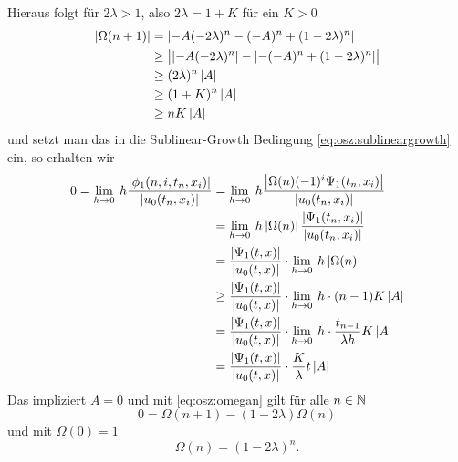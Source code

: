 Hieraus folgt für $2 \lambda > 1$, also $2\lambda = 1 + K$ für ein $K > 0$
\begin{align*}
\left| \Omega(n+1) \right| &= \left| -A (- 2 \lambda)^n -(-A)^n + (1 - 2 \lambda)^n \right|\\
&\geq \bigl\lvert \left| -A (- 2 \lambda)^n \right| - \left| -(-A)^n + (1 - 2 \lambda)^n \right| \bigr\rvert\\
&\geq (2 \lambda)^n \left| A \right|\\
&\geq (1 + K)^n \left| A \right|\\
&\geq n K  \left| A \right|\\
\end{align*}
und setzt man das in die Sublinear-Growth Bedingung \eqref{eq:osz:sublineargrowth} ein, so erhalten wir
\begin{align*}
0 = \lim_{h \to 0} \: h \frac{\left| \phi_1(n, i, t_n, x_i) \right|}{\left| u_0(t_n, x_i) \right|}
&= \lim_{h \to 0} \: h \frac{\left| \Omega(n) (-1)^i \Psi_1(t_n, x_i) \right|}{\left| u_0(t_n, x_i) \right|}\\
&= \lim_{h \to 0} \: h \left| \Omega(n) \right| \frac{\left| \Psi_1(t_n, x_i) \right|}{\left| u_0(t_n, x_i) \right|}\\
&= \frac{\left| \Psi_1(t, x) \right|}{\left| u_0(t, x) \right|} \cdot \lim_{h \to 0} \: h \left| \Omega(n) \right|\\
&\geq \frac{\left| \Psi_1(t, x) \right|}{\left| u_0(t, x) \right|} \cdot \lim_{h \to 0} \: h \cdot (n-1) K \left| A \right|\\
&= \frac{\left| \Psi_1(t, x) \right|}{\left| u_0(t, x) \right|} \cdot \lim_{h \to 0} \: h \cdot \frac{t_{n-1}}{\lambda h} K \left| A \right|\\
&= \frac{\left| \Psi_1(t, x) \right|}{\left| u_0(t, x) \right|} \cdot \frac{K}{\lambda} t \left| A \right|\\
\end{align*}
Das impliziert $A = 0$ und mit \eqref{eq:osz:omegan} gilt für alle $n \in \mathbb N$
\[ 0 = \Omega(n+1) - (1 - 2\lambda) \Omega(n) \]
und mit $\Omega(0) = 1$
\[ \Omega(n) = (1 - 2\lambda)^n. \]